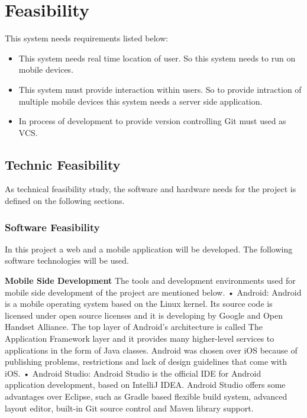 \chapter{Feasibility}
This system needs requirements listed below:
\begin{itemize}
    \item This system needs real time location of user. So this system needs to run on mobile devices.
    \item This system must provide interaction within users. So to provide intraction of multiple mobile devices this system needs a server side application.
    \item In process of development to provide version controlling Git must used as VCS.
\end{itemize}

\section{Technic Feasibility}
As technical feasibility study, the software and hardware needs for the project is defined on the following sections.
\subsection{Software Feasibility}

In this project a web and a mobile application will be developed. The following software
technologies will be used.

\textbf{Mobile Side Development}
\newline
The tools and development environments used for mobile side development of the
project are mentioned below.
\newline
• Android: Android is a mobile operating system based on the Linux kernel. Its
source code is licensed under open source licenses and it is developing by Google
and Open Handset Alliance. The top layer of Android’s architecture is called
The Application Framework layer and it provides many higher-level services to
applications in the form of Java classes. Android was chosen over iOS because
of publishing problems, restrictions and lack of design guidelines that come with
iOS\cite{android}.
\newline
• Android Studio: Android Studio is the official IDE for Android application
development, based on IntelliJ IDEA. Android Studio offers some advantages
over Eclipse, such as Gradle based flexible build system, advanced layout editor,
built-in Git source control and Maven library support\cite{androidStudio}.
\newline

